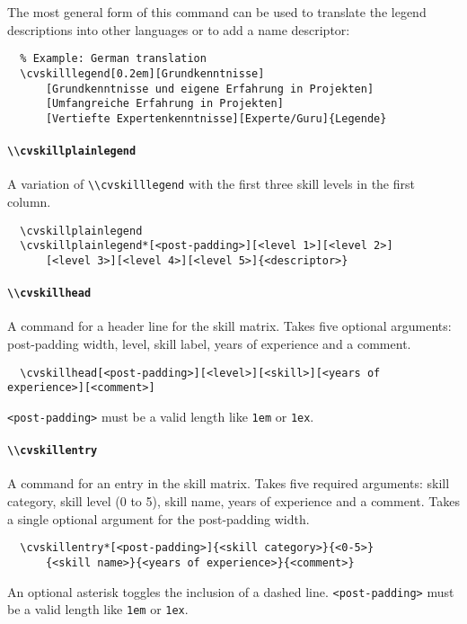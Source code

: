 \documentclass[a4paper, 11pt]{article}
\newcommand{\code}[1]{\lstinline!#1!}
\begin{document}
The most general form of this command can be used to translate the legend descriptions into other languages or to add a name descriptor:
\begin{lstlisting}
  % Example: German translation
  \cvskilllegend[0.2em][Grundkenntnisse]
      [Grundkenntnisse und eigene Erfahrung in Projekten]
      [Umfangreiche Erfahrung in Projekten]
      [Vertiefte Expertenkenntnisse][Experte/Guru]{Legende}
\end{lstlisting}

\paragraph{\code{\\cvskillplainlegend}}
A variation of \code{\\cvskilllegend} with the first three skill levels in the first column.
\begin{lstlisting}
  \cvskillplainlegend
  \cvskillplainlegend*[<post-padding>][<level 1>][<level 2>]
      [<level 3>][<level 4>][<level 5>]{<descriptor>}
\end{lstlisting}

\paragraph{\code{\\cvskillhead}}
A command for a header line for the skill matrix.
Takes five optional arguments: post-padding width, level, skill label, years of experience and a comment.
\begin{lstlisting}
  \cvskillhead[<post-padding>][<level>][<skill>][<years of experience>][<comment>]
\end{lstlisting}
\code{<post-padding>} must be a valid length like \code{1em} or \code{1ex}.

\paragraph{\code{\\cvskillentry}}
A command for an entry in the skill matrix.
Takes five required arguments: skill category, skill level (0 to 5), skill name, years of experience and a comment.
Takes a single optional argument for the post-padding width.
\begin{lstlisting}
  \cvskillentry*[<post-padding>]{<skill category>}{<0-5>}
      {<skill name>}{<years of experience>}{<comment>}
\end{lstlisting}
An optional asterisk toggles the inclusion of a dashed line.
\code{<post-padding>} must be a valid length like \code{1em} or \code{1ex}.
\end{document}
